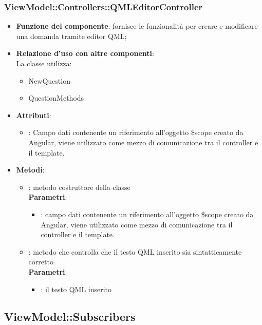 \subsubsection{ViewModel::Controllers::QMLEditorController}
\begin{itemize}
\item\textbf{Funzione del componente}: fornisce le funzionalità per creare e modificare una domanda tramite editor QML;
	\item\textbf{Relazione d'uso con altre componenti}: \\
La classe utilizza:
	\begin{itemize}
		\item NewQuestion
		\item QuestionMethods
	\end{itemize}
\item\textbf{Attributi}:
	\begin{itemize}
		\item{}: Campo dati contenente un riferimento all’oggetto \$scope creato da Angular, viene utilizzato come mezzo di comunicazione tra il controller e il template.\\
	\end{itemize}
\item\textbf{Metodi}:
	\begin{itemize}
		\item{}: metodo costruttore della classe\\
		\textbf{Parametri}:
			\begin{itemize}
				\item{}: campo dati contenente un riferimento all’oggetto \$scope creato da Angular, viene utilizzato come mezzo di comunicazione tra il controller e il template.\\
			\end{itemize}
		\item{}: metodo che controlla che il testo QML inserito sia sintatticamente corretto\\
		\textbf{Parametri}:
			\begin{itemize}
				\item{}: il testo QML inserito\\
			\end{itemize}
	\end{itemize}
\end{itemize}


\subsection{ViewModel::Subscribers}
